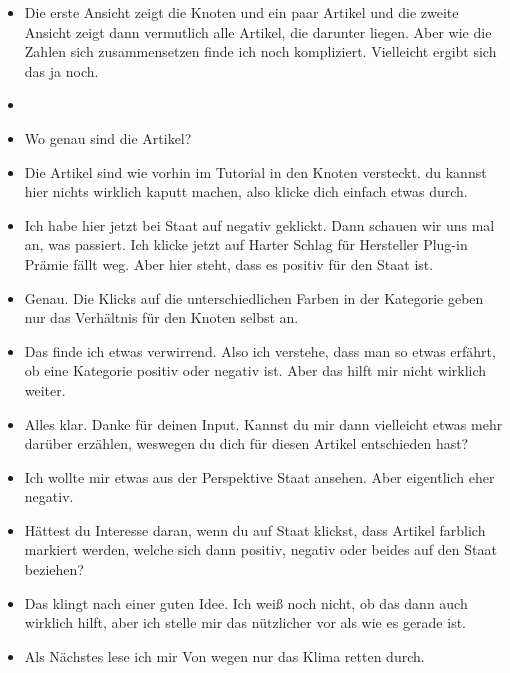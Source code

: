 {\begin{itemize}[]
            \item {} Die erste Ansicht zeigt die Knoten und ein paar Artikel und die zweite Ansicht zeigt dann vermutlich alle Artikel, die darunter liegen.
                  Aber wie die Zahlen sich zusammensetzen finde ich noch kompliziert.
                  Vielleicht ergibt sich das ja noch.
            \item {}
            \item {} Wo genau sind die Artikel?
            \item {} Die Artikel sind wie vorhin im Tutorial in den Knoten versteckt.
                  du kannst hier nichts wirklich kaputt machen, also klicke dich einfach etwas durch.
            \item {} Ich habe hier jetzt bei Staat auf negativ geklickt.
                  Dann schauen wir uns mal an, was passiert.
                  Ich klicke jetzt auf \flqq Harter Schlag für Hersteller Plug-in Prämie fällt weg\frqq{}.
                  Aber hier steht, dass es positiv für den Staat ist.
            \item {} Genau.
                  Die Klicks auf die unterschiedlichen Farben in der Kategorie geben nur das Verhältnis für den Knoten selbst an.
            \item {} Das finde ich etwas verwirrend.
                  Also ich verstehe, dass man so etwas erfährt, ob eine Kategorie positiv oder negativ ist.
                  Aber das hilft mir nicht wirklich weiter.
            \item {} Alles klar.
                  Danke für deinen Input.
                  Kannst du mir dann vielleicht etwas mehr darüber erzählen, weswegen du dich für diesen Artikel entschieden hast?
            \item {} Ich wollte mir etwas aus der Perspektive Staat ansehen. Aber eigentlich eher negativ.
            \item {} Hättest du Interesse daran, wenn du auf Staat klickst, dass Artikel farblich markiert werden, welche sich dann positiv, negativ oder beides auf den Staat beziehen?
            \item {} Das klingt nach einer guten Idee.
                  Ich weiß noch nicht, ob das dann auch wirklich hilft, aber ich stelle mir das nützlicher vor als wie es gerade ist.
            \item {} Als Nächstes lese ich mir \flqq Von wegen nur das Klima retten\frqq{} durch.

\end{itemize}}
